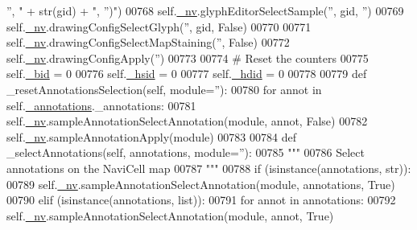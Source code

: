 \begin{DoxyCode}
{      '', "} + str(gid) + \textcolor{stringliteral}{", '')"})
00768             self.\hyperlink{classnavicom_1_1navicom_1_1NaviCom_afff3fd56fa16a68bab52ba8d801e325a}{_nv}.glyphEditorSelectSample(\textcolor{stringliteral}{''}, gid, \textcolor{stringliteral}{''})
00769             self.\hyperlink{classnavicom_1_1navicom_1_1NaviCom_afff3fd56fa16a68bab52ba8d801e325a}{_nv}.drawingConfigSelectGlyph(\textcolor{stringliteral}{''}, gid, \textcolor{keyword}{False})
00770         
00771         self.\hyperlink{classnavicom_1_1navicom_1_1NaviCom_afff3fd56fa16a68bab52ba8d801e325a}{_nv}.drawingConfigSelectMapStaining(\textcolor{stringliteral}{''}, \textcolor{keyword}{False})
00772         self.\hyperlink{classnavicom_1_1navicom_1_1NaviCom_afff3fd56fa16a68bab52ba8d801e325a}{_nv}.drawingConfigApply(\textcolor{stringliteral}{''})
00773 
00774         \textcolor{comment}{# Reset the counters}
00775         self.\hyperlink{classnavicom_1_1navicom_1_1NaviCom_a496d13fc4c8b73cef4f496b713d12b79}{_bid} = 0
00776         self.\hyperlink{classnavicom_1_1navicom_1_1NaviCom_abf768fde5caf68a79e19385b48ea0bcc}{_hsid} = 0
00777         self.\hyperlink{classnavicom_1_1navicom_1_1NaviCom_a095a4a928f1f09319fafc949f8580f78}{_hdid} = 0
00778 
00779     \textcolor{keyword}{def }\_resetAnnotationsSelection(self, module=''):
00780         \textcolor{keywordflow}{for} annot \textcolor{keywordflow}{in} self.\hyperlink{classnavicom_1_1navicom_1_1NaviCom_afb88722efeb86813dcb85818b7065330}{_annotations}.\_annotations:
00781             self.\hyperlink{classnavicom_1_1navicom_1_1NaviCom_afff3fd56fa16a68bab52ba8d801e325a}{_nv}.sampleAnnotationSelectAnnotation(module, annot, \textcolor{keyword}{False})
00782         self.\hyperlink{classnavicom_1_1navicom_1_1NaviCom_afff3fd56fa16a68bab52ba8d801e325a}{_nv}.sampleAnnotationApply(module)
00783 
00784     \textcolor{keyword}{def }\_selectAnnotations(self, annotations, module=''):
00785         \textcolor{stringliteral}{"""}
00786 \textcolor{stringliteral}{        Select annotations on the NaviCell map}
00787 \textcolor{stringliteral}{        """}
00788         \textcolor{keywordflow}{if} (isinstance(annotations, str)):
00789             self.\hyperlink{classnavicom_1_1navicom_1_1NaviCom_afff3fd56fa16a68bab52ba8d801e325a}{_nv}.sampleAnnotationSelectAnnotation(module, annotations, \textcolor{keyword}{True})
00790         \textcolor{keywordflow}{elif} (isinstance(annotations, list)):
00791             \textcolor{keywordflow}{for} annot \textcolor{keywordflow}{in} annotations:
00792                 self.\hyperlink{classnavicom_1_1navicom_1_1NaviCom_afff3fd56fa16a68bab52ba8d801e325a}{_nv}.sampleAnnotationSelectAnnotation(module, annot, \textcolor{keyword}{True})

\end{DoxyCode}
